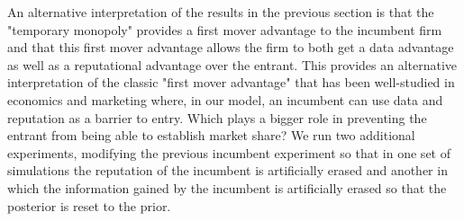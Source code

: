 \documentclass{article}
\theoremstyle{definition}
\begin{document}
An alternative interpretation of the results in the previous section is that the "temporary monopoly" provides a first mover advantage to the incumbent firm and that this first mover advantage allows the firm to both get a data advantage as well as a reputational advantage over the entrant. This provides an alternative interpretation of the classic "first mover advantage" that has been well-studied in economics and marketing \citep*{kerin1992first} where, in our model, an incumbent can use data and reputation as a barrier to entry. Which plays a bigger role in preventing the entrant from being able to establish market share? We run two additional experiments, modifying the previous incumbent experiment so that in one set of simulations the reputation of the incumbent is artificially erased and another in which the information gained by the incumbent is artificially erased so that the posterior is reset to the prior.
\end{document}
